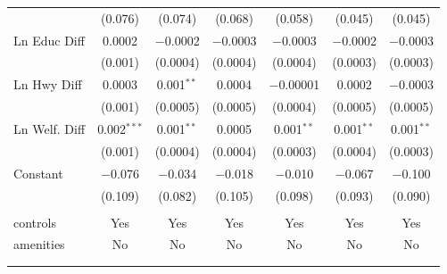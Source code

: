 \begin{table}[!htbp]
\begin{tabular}{@{\extracolsep{5pt}}lcccccc}
  & (0.076) & (0.074) & (0.068) & (0.058) & (0.045) & (0.045) \\ 
  Ln Educ Diff & 0.0002 & $-$0.0002 & $-$0.0003 & $-$0.0003 & $-$0.0002 & $-$0.0003 \\ 
  & (0.001) & (0.0004) & (0.0004) & (0.0004) & (0.0003) & (0.0003) \\ 
  Ln Hwy Diff & 0.0003 & 0.001$^{**}$ & 0.0004 & $-$0.00001 & 0.0002 & $-$0.0003 \\ 
  & (0.001) & (0.0005) & (0.0005) & (0.0004) & (0.0005) & (0.0005) \\ 
  Ln Welf. Diff & 0.002$^{***}$ & 0.001$^{**}$ & 0.0005 & 0.001$^{**}$ & 0.001$^{**}$ & 0.001$^{**}$ \\ 
  & (0.001) & (0.0004) & (0.0004) & (0.0003) & (0.0004) & (0.0003) \\ 
  Constant & $-$0.076 & $-$0.034 & $-$0.018 & $-$0.010 & $-$0.067 & $-$0.100 \\ 
  & (0.109) & (0.082) & (0.105) & (0.098) & (0.093) & (0.090) \\ 
 \hline \\[-1.8ex] 
controls & Yes & Yes & Yes & Yes & Yes & Yes \\ 
amenities & No & No & No & No & No & No \\ 
\hline \\[-1.8ex] 
\hline 
\hline \\[-1.8ex] 
\end{tabular} 
\end{table} 

